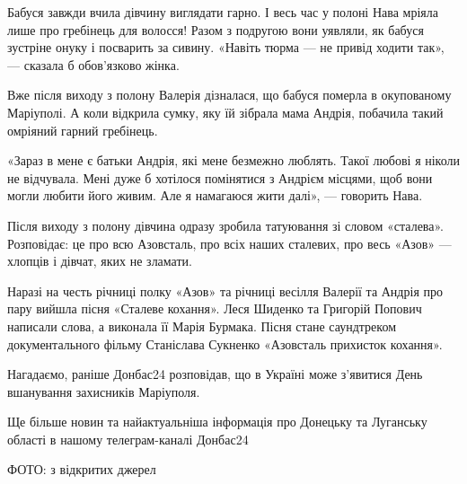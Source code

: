 Бабуся завжди вчила дівчину виглядати гарно. І весь час у полоні Нава мріяла
лише про гребінець для волосся! Разом з подругою вони уявляли, як бабуся
зустріне онуку і посварить за сивину. «Навіть тюрма — не привід ходити так», —
сказала б обов'язково жінка.

Вже після виходу з полону Валерія дізналася, що бабуся померла в окупованому
Маріуполі. А коли відкрила сумку, яку їй зібрала мама Андрія, побачила такий
омріяний гарний гребінець.

«Зараз в мене є батьки Андрія, які мене безмежно люблять. Такої любові я ніколи
не відчувала. Мені дуже б хотілося помінятися з Андрієм місцями, щоб вони могли
любити його живим. Але я намагаюся жити далі», — говорить Нава.

Після виходу з полону дівчина одразу зробила татуювання зі словом «сталева».
Розповідає: це про всю Азовсталь, про всіх наших сталевих, про весь «Азов» —
хлопців і дівчат, яких не зламати.

Наразі на честь річниці полку «Азов» та річниці весілля Валерії та Андрія про
пару вийшла пісня «Сталеве кохання». Леся Шиденко та Григорій Попович написали
слова, а виконала її Марія Бурмака. Пісня стане саундтреком документального
фільму Станіслава Сукненко «Азовсталь прихисток кохання».

Нагадаємо, раніше Донбас24 розповідав, що в Україні може з'явитися День
вшанування захисників Маріуполя.

Ще більше новин та найактуальніша інформація про Донецьку та Луганську області
в нашому телеграм-каналі Донбас24

ФОТО: з відкритих джерел
